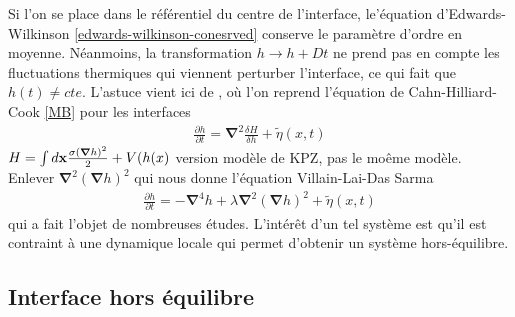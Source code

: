 Si l'on se place dans le référentiel du centre de l'interface, le'équation d'Edwards-Wilkinson \ref{edwards-wilkinson-conesrved} conserve le paramètre d'ordre en moyenne. Néanmoins, la transformation $h \rightarrow h + Dt$ ne prend pas en compte les fluctuations thermiques qui viennent perturber l'interface, ce qui fait que $h(t) \neq cte$. L'astuce vient ici de \cite{kawasaki_diffusion_1966,kawasaki_correlation-function_1966}, où l'on reprend l'équation de Cahn-Hilliard-Cook \ref{MB} pour les interfaces
\begin{align}
    \frac{\partial h}{\partial t} =  {\boldsymbol \nabla}^2 \frac{\delta H}{\delta h} +  \tilde{\eta}(x,t)
\end{align}
{\color{red}$ H =\int d {\bf x} \frac{\sigma ({\boldsymbol \nabla} h)^2}{2} +V(h(x) $}
{\color{red} version modèle de KPZ, pas le moême modèle. Enlever ${\boldsymbol \nabla}^2 ({\boldsymbol \nabla} h)^2$}
qui nous donne l'équation Villain-Lai-Das Sarma\cite{villain_continuum_1991,lai_kinetic_1991}
\begin{align}
    \frac{\partial h}{\partial t} = - {\boldsymbol \nabla}^4 h + \lambda {\boldsymbol \nabla}^2 ({\boldsymbol \nabla} h) ^2 +  \tilde{\eta}(x,t)
\end{align}
qui a fait l'objet de nombreuses études\cite{kim_conserved_1994,assis_dynamic_2015,oliveira_maximal-_2008,singha_renormalization_2016}.
L'intérêt d'un tel système est qu'il est contraint à une dynamique locale qui permet d'obtenir un système hors-équilibre. 

    \subsection{Interface hors équilibre}

